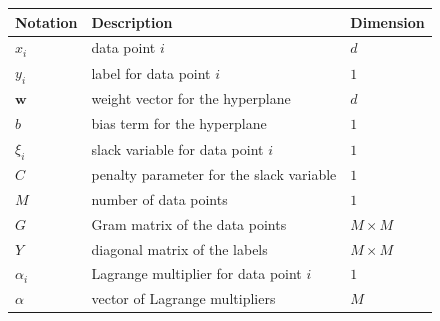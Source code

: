 \begin{tabular}{lll}
  \toprule
  \textbf{Notation} & \textbf{Description}                     & \textbf{Dimension} \\
  \midrule
  $x_i$             & data point $i$                           & $d$                \\
  $y_i$             & label for data point $i$                 & $1$                \\
  $\symbf{w}$       & weight vector for the hyperplane         & $d$                \\
  $b$               & bias term for the hyperplane             & $1$                \\
  $\xi_i$           & slack variable for data point $i$        & $1$                \\
  $C$               & penalty parameter for the slack variable & $1$                \\
  $M$               & number of data points                    & $1$                \\
  $G$               & Gram matrix of the data points           & $M \times M$       \\
  $Y$               & diagonal matrix of the labels            & $M \times M$       \\
  $\alpha_i$        & Lagrange multiplier for data point $i$   & $1$                \\
  $\alpha$          & vector of Lagrange multipliers           & $M$                \\
  \bottomrule
\end{tabular}



